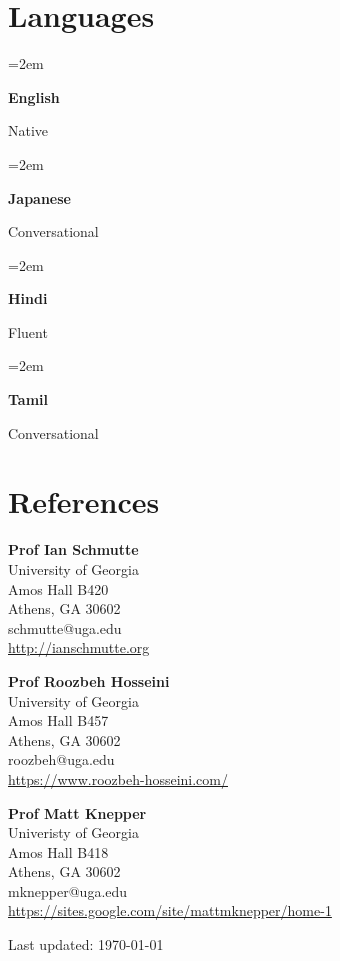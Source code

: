 \documentclass[letterpaper]{article}
\newcommand{\lan}[2]{
    \noindent\hangindent=2em\hangafter=0
    \parbox{\spacebox}{%
        \textbf{#1}} %
     #2 \par
}%
\newlength{\spacebox}
\def\footerlink{}
\begin{document}
\section*{Languages}
\lan{English}{Native} %
\lan{Japanese}{Conversational} %
\lan{Hindi}{Fluent} %
\lan{Tamil}{Conversational} %
\section*{References}
\begin{minipage}[t]{0.34\textwidth}

  \textbf{Prof Ian Schmutte}\\
  University of Georgia\\
  Amos Hall B420\\
  Athens, GA 30602 \\
  schmutte@uga.edu\\
  \url{http://ianschmutte.org}
\end{minipage}
\begin{minipage}[t]{0.33\textwidth}

  \textbf{Prof Roozbeh Hosseini}\\
  University of Georgia\\
  Amos Hall B457\\
  Athens, GA 30602\\
  roozbeh@uga.edu\\
  \url{https://www.roozbeh-hosseini.com/}
\end{minipage}
\begin{minipage}[t]{0.33\textwidth}

  \textbf{Prof Matt Knepper}\\
  Univeristy of Georgia\\
  Amos Hall B418\\
  Athens, GA 30602\\
  mknepper@uga.edu\\
  \url{https://sites.google.com/site/mattmknepper/home-1}
\end{minipage}



  \begin{footnotesize}
    Last updated: \today \\
    \url{\footerlink}  \\
  \end{footnotesize}
\end{document}
